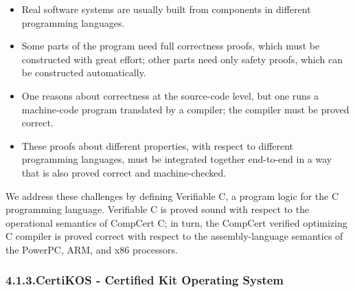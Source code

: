 \documentclass[12pt,twoside]{article}
\begin{document}
\begin{itemize}%

\item{}
Real software systems are usually built from components in different
programming languages.%

\item{}
Some parts of the program need full correctness proofs, which must
be constructed with great effort; other parts need only safety
proofs, which can be constructed automatically.%

\item{}
One reasons about correctness at the source-code level, but one runs
a machine-code program translated by a compiler; the compiler must
be proved correct.%

\item{}
These proofs about different properties, with respect to different
programming languages, must be integrated together end-to-end in a
way that is also proved correct and machine-checked.%
\end{itemize}%

\noindent{}We address these challenges by defining Verifiable C, a program logic
for the C programming language. Verifiable C is proved sound with
respect to the operational semantics of CompCert C; in turn, the
CompCert verified optimizing C compiler is proved correct with respect
to the assembly-language semantics of the PowerPC, ARM, and x86
processors.%

\subsubsection{4.1.3.\hspace*{0.5em}CertiKOS - Certified Kit Operating System}%
\end{document}
